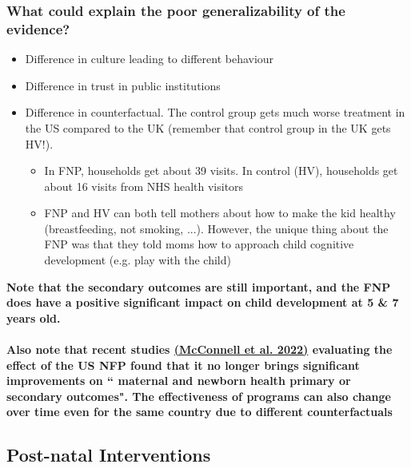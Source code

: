 \subsubsection{What could explain the poor generalizability of the evidence?}
\begin{itemize}
    \item Difference in culture leading to different behaviour
    \item Difference in trust in public institutions
    \item Difference in counterfactual. The control group gets much worse treatment in the US compared to the UK (remember that control group in the UK gets HV!).
    \begin{itemize}
        \item In FNP, households get about 39 visits. In control (HV), households get about 16 visits from NHS health visitors
        \item FNP and HV can both tell mothers about how to make the kid healthy (breastfeeding, not smoking, ...). However, the unique thing about the FNP was that they told moms how to approach child cognitive development (e.g. play with the child)
    \end{itemize}
\end{itemize}
\textbf{Note that the secondary outcomes are still important, and the FNP does have a positive significant impact on child development at 5 \& 7 years old.}\\ \\
\textbf{Also note that recent studies \href{https://jamanetwork.com/journals/jama/article-abstract/2793825?casa_token=hmQ4aJAMtL8AAAAA:22C4Pg2uXeayMj306ws_iqVE56LIoViTQfKUWIhJoXNQ4S9YLAZofvhEgmKVeFYWdOQ3800Tcj4}{(McConnell et al. 2022)} evaluating the effect of the US NFP found that it no longer brings significant improvements on `` maternal and newborn health primary or secondary outcomes". The effectiveness of programs can also change over time even for the same country due to different counterfactuals} 
\subsection{Post-natal Interventions}
